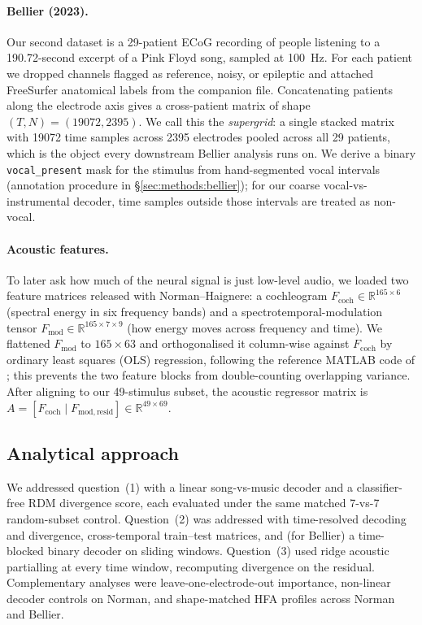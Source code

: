 \documentclass[11pt]{article}
\begin{document}
\paragraph{Bellier (2023).} Our second dataset is a 29-patient ECoG recording of people listening to a 190.72-second excerpt of a Pink Floyd song, sampled at 100~Hz. For each patient we dropped channels flagged as reference, noisy, or epileptic and attached FreeSurfer anatomical labels from the companion file. Concatenating patients along the electrode axis gives a cross-patient matrix of shape $(T, N) = (19072, 2395)$. We call this the \emph{supergrid}: a single stacked matrix with 19072 time samples across 2395 electrodes pooled across all 29 patients, which is the object every downstream Bellier analysis runs on. We derive a binary \texttt{vocal\_present} mask for the stimulus from hand-segmented vocal intervals (annotation procedure in \S\ref{sec:methods:bellier}); for our coarse vocal-vs-instrumental decoder, time samples outside those intervals are treated as non-vocal.

\paragraph{Acoustic features.} To later ask how much of the neural signal is just low-level audio, we loaded two feature matrices released with Norman--Haignere: a cochleogram $F_{\mathrm{coch}} \in \mathbb{R}^{165 \times 6}$ (spectral energy in six frequency bands) and a spectrotemporal-modulation tensor $F_{\mathrm{mod}} \in \mathbb{R}^{165 \times 7 \times 9}$ (how energy moves across frequency and time). We flattened $F_{\mathrm{mod}}$ to $165 \times 63$ and orthogonalised it column-wise against $F_{\mathrm{coch}}$ by ordinary least squares (OLS) regression, following the reference MATLAB code of \citet{NormanHaignere2022}; this prevents the two feature blocks from double-counting overlapping variance. After aligning to our 49-stimulus subset, the acoustic regressor matrix is $A = [F_{\mathrm{coch}} \mid F_{\mathrm{mod,resid}}] \in \mathbb{R}^{49 \times 69}$.

\subsection{Analytical approach}
We addressed question~(1) with a linear song-vs-music decoder and a classifier-free RDM divergence score, each evaluated under the same matched 7-vs-7 random-subset control. Question~(2) was addressed with time-resolved decoding and divergence, cross-temporal train--test matrices, and (for Bellier) a time-blocked binary decoder on sliding windows. Question~(3) used ridge acoustic partialling at every time window, recomputing divergence on the residual. Complementary analyses were leave-one-electrode-out importance, non-linear decoder controls on Norman, and shape-matched HFA profiles across Norman and Bellier.
\end{document}
